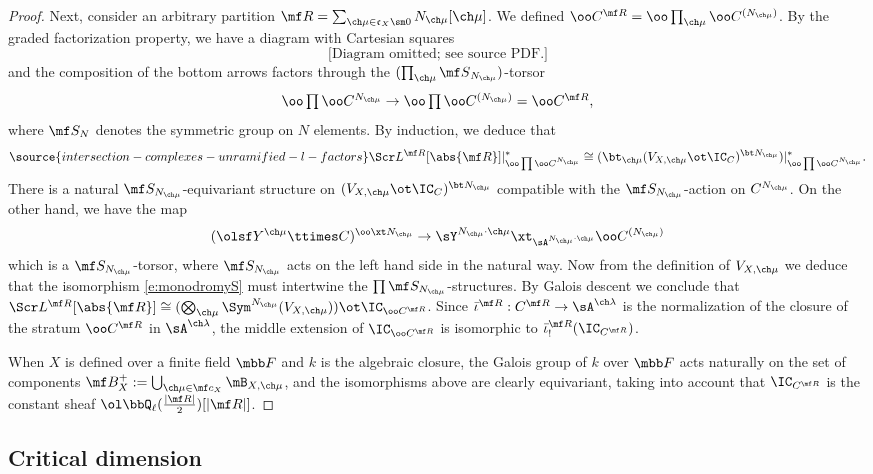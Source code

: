 \begin{proof}
Next, consider an arbitrary partition
$\mf R = \sum_{\ch\mu\in \mathfrak c_X\sm 0} N_{\ch\mu} [\ch\mu]$.
We defined $\oo C^{\mf R} = \oo\prod_{\ch\mu} \oo C^{(N_{\ch\mu})}$.
By the graded factorization property, we have a diagram
with Cartesian squares
\[
\text{[Diagram omitted; see source PDF.]}
\]
and the composition of the bottom arrows
factors through the $(\prod_{\ch\mu} {\mf S}_{N_{\ch\mu}})$-torsor
\[ \textstyle \oo \prod \oo C^{N_{\ch\mu}} \to \oo \prod \oo C^{(N_{\ch\mu})} = \oo C^{\mf R},
\]
where $\mf S_N$ denotes the symmetric group on $N$ elements.
By induction, we deduce that
\begin{equation} \label{e:monodromyS}
\source{intersection-complexes-unramified-l-factors}
     \Scr L^{\mf R}[ \abs{\mf R} ]|^*_{\oo\prod \oo C^{N_{\ch\mu}} }
\cong ( \bt_{\ch\mu} (V_{X,\ch\mu} \ot \IC_C)^{\bt N_{\ch\mu}} )|^*_{\oo \prod \oo C^{N_{\ch\mu}} }.
\end{equation}
There is a natural $\mf S_{N_{\ch\mu}}$-equivariant structure
on $(V_{X,\ch\mu} \ot \IC_C)^{\bt N_{\ch\mu}}$
compatible with the $\mf S_{N_{\ch\mu}}$-action on $C^{N_{\ch\mu}}$.
On the other hand, we have the map
\[ (\olsf Y^{\ch\mu} \ttimes C)^{\oo\xt N_{\ch\mu}} \to
\sY^{N_{\ch\mu}\cdot\ch\mu} \xt_{\sA^{N_{\ch\mu}\cdot\ch\mu}} \oo C^{(N_{\ch\mu})}
\]
which is a $\mf S_{N_{\ch\mu}}$-torsor, where $\mf S_{N_{\ch\mu}}$
acts on the left hand side in the natural way.
Now from the definition of $V_{X,\ch\mu}$ we deduce
that the isomorphism \eqref{e:monodromyS} must
intertwine the $\prod \mf S_{N_{\ch\mu}}$-structures.
By Galois descent we conclude that
$\Scr L^{\mf R} [ \abs{\mf R} ]\cong (\bigotimes_{\ch\mu}
\Sym^{N_{\ch\mu}}(V_{X,\ch\mu})) \ot \IC_{\oo C^{\mf R}}$.
Since $\bar\iota^{\mf R} : C^{\mf R} \to \sA^{\ch\lambda}$ is
the normalization of the closure of the stratum $\oo C^{\mf R}$ in $\sA^{\ch\lambda}$,
the middle extension of $\IC_{\oo C^{\mf R}}$ is
isomorphic to $\bar\iota^{\mf R}_!(\IC_{C^{\mf R}})$.

When $X$ is defined over a finite field $\mbb F$ and $k$ is the algebraic closure, the Galois group of $k$ over $\mbb F$ acts naturally on the set of components $\mf B^+_X := \bigcup_{\ch\mu\in \mf c_X} \mB_{X,\ch\mu}$, and the isomorphisms above are clearly equivariant, taking into account that $\IC_{C^{\mf R}}$ is the constant sheaf $ \ol\bbQ_\ell(\frac{|\mf R|}{2})[|\mf R|]$.
\end{proof}




\subsection{Critical dimension}



